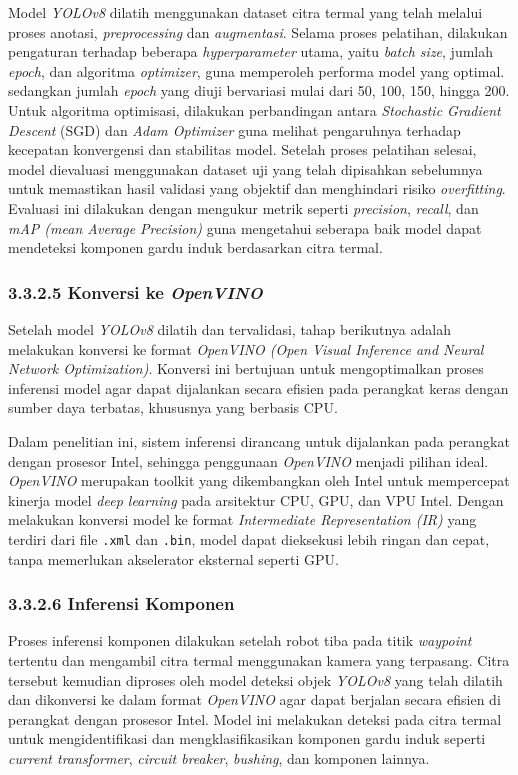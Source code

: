 Model \emph{YOLOv8} dilatih menggunakan dataset citra termal yang telah melalui proses anotasi, \emph{preprocessing} dan \emph{augmentasi}. Selama proses pelatihan, dilakukan pengaturan terhadap beberapa \emph{hyperparameter} utama, yaitu \emph{batch size}, jumlah \emph{epoch}, dan algoritma \emph{optimizer}, guna memperoleh performa model yang optimal. sedangkan jumlah \emph{epoch} yang diuji bervariasi mulai dari 50, 100, 150, hingga 200. Untuk algoritma optimisasi, dilakukan perbandingan antara \emph{Stochastic Gradient Descent} (SGD) dan \emph{Adam Optimizer} guna melihat pengaruhnya terhadap kecepatan konvergensi dan stabilitas model.  Setelah proses pelatihan selesai, model dievaluasi menggunakan dataset uji yang telah dipisahkan sebelumnya untuk memastikan hasil validasi yang objektif dan menghindari risiko \emph{overfitting}. Evaluasi ini dilakukan dengan mengukur metrik seperti \emph{precision}, \emph{recall}, dan \emph{mAP (mean Average Precision)} guna mengetahui seberapa baik model dapat mendeteksi komponen gardu induk berdasarkan citra termal.


\subsubsection{3.3.2.5 Konversi ke \emph{OpenVINO}}
Setelah model \emph{YOLOv8} dilatih dan tervalidasi, tahap berikutnya adalah melakukan konversi ke format \emph{OpenVINO (Open Visual Inference and Neural Network Optimization)}. Konversi ini bertujuan untuk mengoptimalkan proses inferensi model agar dapat dijalankan secara efisien pada perangkat keras dengan sumber daya terbatas, khususnya yang berbasis CPU.

Dalam penelitian ini, sistem inferensi dirancang untuk dijalankan pada perangkat dengan prosesor Intel, sehingga penggunaan \emph{OpenVINO} menjadi pilihan ideal. \emph{OpenVINO} merupakan toolkit yang dikembangkan oleh Intel untuk mempercepat kinerja model \emph{deep learning} pada arsitektur CPU, GPU, dan VPU Intel. Dengan melakukan konversi model ke format \emph{Intermediate Representation (IR)} yang terdiri dari file \texttt{.xml} dan \texttt{.bin}, model dapat dieksekusi lebih ringan dan cepat, tanpa memerlukan akselerator eksternal seperti GPU.

\subsubsection{3.3.2.6 Inferensi Komponen}

Proses inferensi komponen dilakukan setelah robot tiba pada titik \emph{waypoint} tertentu dan mengambil citra termal menggunakan kamera yang terpasang. Citra tersebut kemudian diproses oleh model deteksi objek \emph{YOLOv8} yang telah dilatih dan dikonversi ke dalam format \emph{OpenVINO} agar dapat berjalan secara efisien di perangkat dengan prosesor Intel. Model ini melakukan deteksi pada citra termal untuk mengidentifikasi dan mengklasifikasikan komponen gardu induk seperti \emph{current transformer}, \emph{circuit breaker}, \emph{bushing}, dan komponen lainnya.

